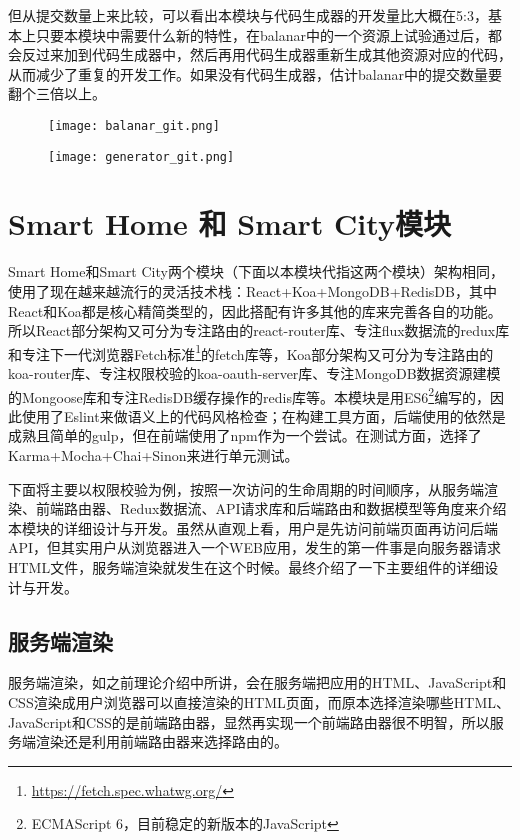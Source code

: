 但从提交数量上来比较，可以看出本模块与代码生成器的开发量比大概在5:3，基本上只要本模块中需要什么新的特性，在balanar中的一个资源上试验通过后，都会反过来加到代码生成器中，然后再用代码生成器重新生成其他资源对应的代码，从而减少了重复的开发工作。如果没有代码生成器，估计balanar中的提交数量要翻个三倍以上。
\begin{figure}[H]
 \centering
 \texttt{[image: balanar\_git.png]}

 \vspace{0.5cm}

 \texttt{[image: generator\_git.png]}
\end{figure}

\section{Smart Home 和 Smart City模块}
Smart Home和Smart City两个模块（下面以本模块代指这两个模块）架构相同，使用了现在越来越流行的灵活技术栈：React+Koa+MongoDB+RedisDB，其中React和Koa都是核心精简类型的，因此搭配有许多其他的库来完善各自的功能。所以React部分架构又可分为专注路由的react-router库、专注flux数据流的redux库和专注下一代浏览器Fetch标准\footnote{\url{https://fetch.spec.whatwg.org/}}的fetch库等，Koa部分架构又可分为专注路由的koa-router库、专注权限校验的koa-oauth-server库、专注MongoDB数据资源建模的Mongoose库和专注RedisDB缓存操作的redis库等。本模块是用ES6\footnote{ECMAScript 6，目前稳定的新版本的JavaScript}编写的，因此使用了Eslint来做语义上的代码风格检查；在构建工具方面，后端使用的依然是成熟且简单的gulp，但在前端使用了npm作为一个尝试。在测试方面，选择了Karma+Mocha+Chai+Sinon来进行单元测试。

下面将主要以权限校验为例，按照一次访问的生命周期的时间顺序，从服务端渲染、前端路由器、Redux数据流、API请求库和后端路由和数据模型等角度来介绍本模块的详细设计与开发。虽然从直观上看，用户是先访问前端页面再访问后端API，但其实用户从浏览器进入一个WEB应用，发生的第一件事是向服务器请求HTML文件，服务端渲染就发生在这个时候。最终介绍了一下主要组件的详细设计与开发。
\subsection{服务端渲染}
服务端渲染，如之前理论介绍中所讲，会在服务端把应用的HTML、JavaScript和CSS渲染成用户浏览器可以直接渲染的HTML页面，而原本选择渲染哪些HTML、JavaScript和CSS的是前端路由器，显然再实现一个前端路由器很不明智，所以服务端渲染还是利用前端路由器来选择路由的。


